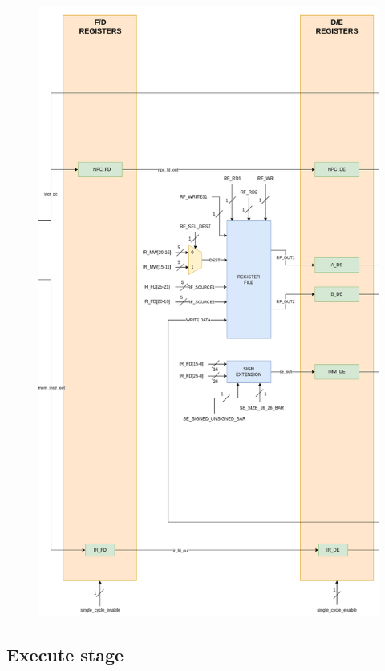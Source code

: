 \begin{figure}
\begin{minipage}{.5\textwidth}
  \includegraphics[height=1.80\linewidth]{images/decode_stage.png}
  \label{fig:decode_stage}
\end{minipage}
\end{figure}

\subsection{Execute stage}

